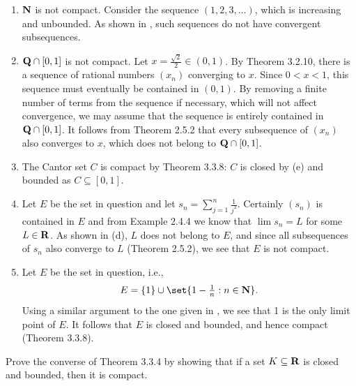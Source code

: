 \documentclass{lew98_solutions}
\begin{document}
\begin{solution}
    \begin{enumerate}
        \item \( \mathbf{N} \) is not compact. Consider the sequence \( (1, 2, 3, \ldots) \), which is increasing and unbounded. As shown in , such sequences do not have convergent subsequences.

        \item \( \mathbf{Q} \cap [0, 1] \) is not compact. Let \( x = \tfrac{\sqrt{2}}{2} \in (0, 1) \). By Theorem 3.2.10, there is a sequence of rational numbers \( (x_n) \) converging to \( x \). Since \( 0 < x < 1 \), this sequence must eventually be contained in \( (0, 1) \). By removing a finite number of terms from the sequence if necessary, which will not affect convergence, we may assume that the sequence is entirely contained in \( \mathbf{Q} \cap [0, 1] \). It follows from Theorem 2.5.2 that every subsequence of \( (x_n) \) also converges to \( x \), which does not belong to \( \mathbf{Q} \cap [0, 1] \).

        \item The Cantor set \( C \) is compact by Theorem 3.3.8: \( C \) is closed by  (e) and bounded as \( C \subseteq [0, 1] \).

        \item Let \( E \) be the set in question and let \( s_n = \sum_{j=1}^n \tfrac{1}{j^2} \). Certainly \( (s_n) \) is contained in \( E \) and from Example 2.4.4 we know that \( \lim s_n = L \) for some \( L \in \mathbf{R} \). As shown in  (d), \( L \) does not belong to \( E \), and since all subsequences of \( s_n \) also converge to \( L \) (Theorem 2.5.2), we see that \( E \) is not compact.

        \item Let \( E \) be the set in question, i.e.,
        \[
            E = \{ 1 \} \cup \set{ 1 - \tfrac{1}{n} : n \in \N }.
        \]
        Using a similar argument to the one given in , we see that 1 is the only limit point of \( E \). It follows that \( E \) is closed and bounded, and hence compact (Theorem 3.3.8).
    \end{enumerate}
\end{solution}

\begin{exercise}
\label{ex:3.3.3}
    Prove the converse of Theorem 3.3.4 by showing that if a set \( K \subseteq \mathbf{R} \) is closed and bounded, then it is compact.
\end{exercise}
\end{document}
